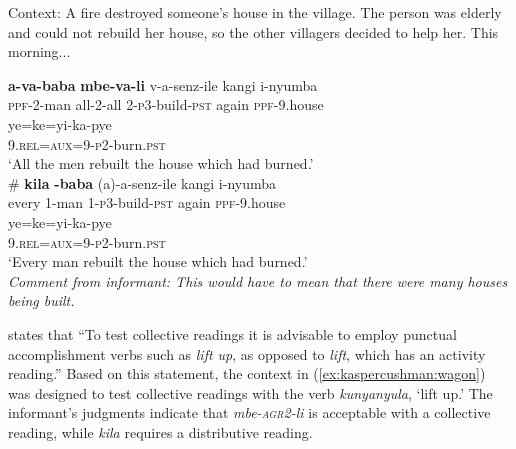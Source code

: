 \documentclass[output=paper,modfonts,nonflat]{langsci/langscibook}
\begin{document}
\begin{exe}

 \ex Context: A fire destroyed someone's house in the village. The person was elderly and could not rebuild her house, so the other villagers decided to help her. This morning...  \\

\begin{xlist}

\ex 
\gll \textbf{a-va-baba} \textbf{mbe-va-li} v-a-senz-ile kangi i-nyumba \\
\textsc{ppf}-2-man all-2-all 2-\textsc{p3}-build-\textsc{pst} again \textsc{ppf}-9.house\\


\gll ye=ke=yi-ka-pye  \\ 
 9.\textsc{rel}=\textsc{aux}=9-\textsc{p2}-burn.\textsc{pst} \\
\glt `All the men rebuilt the house which had burned.' \\



\ex 
\gll \# \textbf{kila} \textbf{-baba} (a)-a-senz-ile kangi i-nyumba \\
{} every 1-man 1-\textsc{p3}-build-\textsc{pst} again \textsc{ppf}-9.house \\


\gll ye=ke=yi-ka-pye   \\ 
9.\textsc{rel}=\textsc{aux}=9-\textsc{p2}-burn.\textsc{pst}\\
\glt `Every man rebuilt the house which had burned.' \\ 
\textit{Comment from informant: This would have to mean that there were many houses being built.}

\end{xlist}
\end{exe}


\citealt[p. 121]{szabolcsi10} states that ``To test collective readings it is advisable to employ punctual accomplishment verbs such as \textit{lift up}, as opposed to \emph{lift}, which has an activity reading.'' Based on this statement, the context in (\ref{ex:kaspercushman:wagon}) was designed to test collective readings with the verb \textit{kunyanyula}, `lift up.' The informant's judgments indicate that  \textit{mbe-\textsc{agr2}-li} is acceptable with a collective reading, while \textit{kila} requires a distributive reading. 
\end{document}
